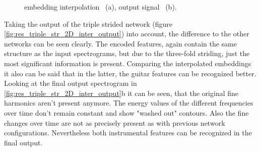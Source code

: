 \begin{figure}[htb!]
    \centering
    \caption{embedding interpolation ~(a), output signal ~(b).}
    \label{fig:res_double_str_2D_inter_output}
\end{figure}

Taking the output of the triple strided network (figure \ref{fig:res_triple_str_2D_inter_output}) into account, the difference to the other networks can be seen clearly. The encoded features, again contain the same structure as the input spectrograms, but due to the three-fold striding, just the most significant information is present. Comparing the interpolated embeddings it also can be said that in the latter, the guitar features can be recognized better. Looking at the final output spectrogram in \ref{fig:res_triple_str_2D_inter_output}b it can be seen, that the original fine harmonics aren't present anymore. The energy values of the different frequencies over time don't remain constant and show "washed out" contours. Also the fine changes over time are not as precisely present as with previous network configurations. Nevertheless both instrumental features can be recognized in the final output. 

